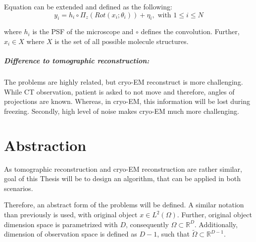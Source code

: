 Equation can be extended and defined as the following:
\begin{equation}
    \label{eq:cryoEmExtended}
    y_i = h_i \circ \Pi_z ( \textit{Rot} (x_i; \theta_i)) + \eta_i, \text{ with } 1 \leq i \leq N
\end{equation}

where $h_i$ is the PSF of the microscope and $\circ$ defines the convolution.
Further, $x_i \in X$ where $X$ is the set of all possible molecule structures.


\subparagraph{Difference to tomographic reconstruction:}
The problems are highly related, but cryo-EM reconstruct is more challenging.
While CT observation, patient is asked to not move and therefore, angles of projections are known.
Whereas, in cryo-EM, this information will be lost during freezing.
Secondly, high level of noise makes cryo-EM much more challenging.

\clearpage

\section{Abstraction}

\label{sec:abstract_form}
As tomographic reconstruction and cryo-EM reconstruction are rather similar, 
goal of this Thesis will be to design an algorithm, that can be applied in both scenarios.

Therefore, an abstract form of the problems will be defined.
A similar notation than previously is used, with original object $x \in L^2(\Omega)$.
Further, original object dimension space is parametrized with $D$, consequently $\Omega \subset \mathbb{R}^D$.
Additionally, dimension of observation space is defined as $D-1$, such that 
$\tilde{\Omega} \subset \mathbb{R}^{D-1}$.


